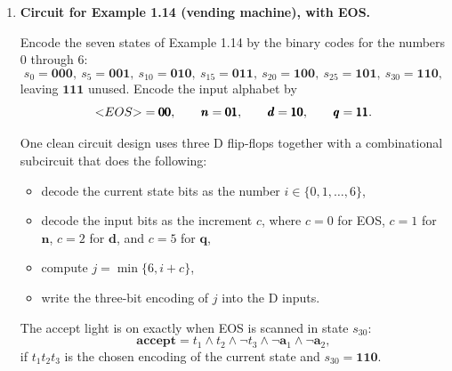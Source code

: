 \documentclass[11pt,openany]{book}
\def\<{\text{\textless}}
\def\>{\text{\textgreater}}
\begin{document}
\begin{enumerate}[{1.}1.]
\item \textbf{Circuit for Example 1.14 (vending machine), with EOS.}

Encode the seven states of Example 1.14 by the binary codes for the numbers $0$ through $6$:
\[
s_0=\pmb{000},\ s_5=\pmb{001},\ s_{10}=\pmb{010},\ s_{15}=\pmb{011},\ s_{20}=\pmb{100},\ s_{25}=\pmb{101},\ s_{30}=\pmb{110},
\]
leaving $\pmb{111}$ unused. Encode the input alphabet by
\[
\<EOS\>=\pmb{00},\qquad \pmb{n}=\pmb{01},\qquad \pmb{d}=\pmb{10},\qquad \pmb{q}=\pmb{11}.
\]

One clean circuit design uses three D flip-flops together with a combinational subcircuit that does the following:
\begin{itemize}
\item decode the current state bits as the number $i\in\{0,1,\ldots,6\}$,
\item decode the input bits as the increment $c$, where $c=0$ for \<EOS\>, $c=1$ for $\pmb{n}$, $c=2$ for $\pmb{d}$, and $c=5$ for $\pmb{q}$,
\item compute $j=\min\{6,i+c\}$,
\item write the three-bit encoding of $j$ into the D inputs.
\end{itemize}
The accept light is on exactly when \<EOS\> is scanned in state $s_{30}$:
\[
\textbf{accept}=t_1\wedge t_2\wedge \neg t_3\wedge \neg \pmb{a}_1\wedge \neg \pmb{a}_2,
\]
if $t_1t_2t_3$ is the chosen encoding of the current state and $s_{30}=\pmb{110}$.


\end{enumerate}
\end{document}
